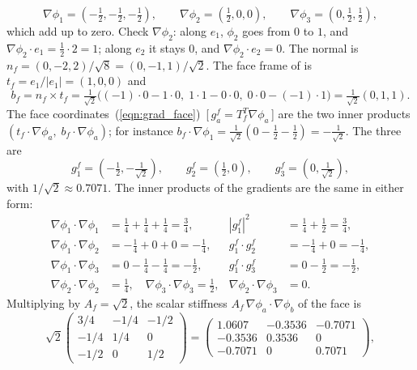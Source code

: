 \begin{example}
\begin{equation*}
\nabla\phi_1 = \left(-\tfrac12, -\tfrac12, -\tfrac12\right), \qquad \nabla\phi_2 = \left(\tfrac12, 0, 0\right), \qquad \nabla\phi_3 = \left(0, \tfrac12, \tfrac12\right),
\end{equation*}
which add up to zero. Check $\nabla\phi_2$: along $e_1$, $\phi_2$ goes from $0$ to $1$, and $\nabla\phi_2 \cdot e_1 = \frac12\cdot 2 = 1$; along $e_2$ it stays $0$, and $\nabla\phi_2 \cdot e_2 = 0$. The normal is $n_f = (0, -2, 2)/\sqrt 8 = (0, -1, 1)/\sqrt2$. The face frame of  is $t_f = e_1/|e_1| = (1, 0, 0)$ and
\begin{equation*}
b_f = n_f\times t_f = \tfrac{1}{\sqrt2}\big((-1)\cdot 0 - 1\cdot 0,\; 1\cdot 1 - 0\cdot 0,\; 0\cdot 0 - (-1)\cdot 1\big) = \tfrac{1}{\sqrt 2}(0, 1, 1) .
\end{equation*}
The face coordinates~(\ref{eqn:grad_face})~[\,$g_a^f = T_f^T\nabla\phi_a$\,] are the two inner products $(t_f\cdot\nabla\phi_a,\; b_f\cdot\nabla\phi_a)$; for instance $b_f\cdot\nabla\phi_1 = \frac{1}{\sqrt 2}(0 - \frac12 - \frac12) = -\frac{1}{\sqrt 2}$. The three are
\begin{equation*}
g_1^f = \left(-\tfrac12, -\tfrac{1}{\sqrt2}\right), \qquad g_2^f = \left(\tfrac12, 0\right), \qquad g_3^f = \left(0, \tfrac{1}{\sqrt2}\right),
\end{equation*}
with $1/\sqrt 2 \approx 0.7071$. The inner products of the gradients are the same in either form:
\begin{align*}
\nabla\phi_1\cdot\nabla\phi_1 &= \tfrac14 + \tfrac14 + \tfrac14 = \tfrac34, & |g_1^f|^2 &= \tfrac14 + \tfrac12 = \tfrac34, \\
\nabla\phi_1\cdot\nabla\phi_2 &= -\tfrac14 + 0 + 0 = -\tfrac14, & g_1^f\cdot g_2^f &= -\tfrac14 + 0 = -\tfrac14, \\
\nabla\phi_1\cdot\nabla\phi_3 &= 0 - \tfrac14 - \tfrac14 = -\tfrac12, & g_1^f\cdot g_3^f &= 0 - \tfrac12 = -\tfrac12, \\
\nabla\phi_2\cdot\nabla\phi_2 &= \tfrac14, \quad \nabla\phi_3\cdot\nabla\phi_3 = \tfrac12, & \nabla\phi_2\cdot\nabla\phi_3 &= 0 .
\end{align*}
Multiplying by $A_f = \sqrt 2$, the scalar stiffness $A_f\, \nabla\phi_a \cdot \nabla\phi_b$ of the face is
\begin{equation*}
\sqrt 2 \begin{pmatrix} 3/4 & -1/4 & -1/2 \\ -1/4 & 1/4 & 0 \\ -1/2 & 0 & 1/2 \end{pmatrix} = \begin{pmatrix} 1.0607 & -0.3536 & -0.7071 \\ -0.3536 & 0.3536 & 0 \\ -0.7071 & 0 & 0.7071 \end{pmatrix},

\end{equation*}
\end{example}
